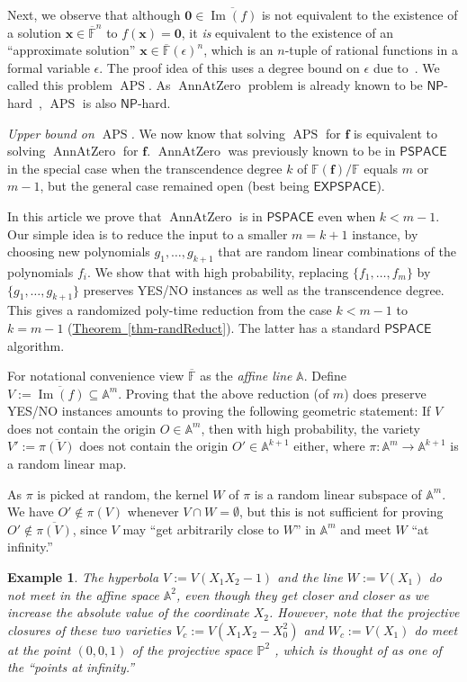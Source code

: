 \documentclass[11pt]{article}
\numberwithin{equation}{section}
\theoremstyle{definition}
\theoremstyle{plain}
\newcommand{\cclass}[1]{\textsf{#1}}
\newcommand{\expref}[2]{\hyperref[#2]{#1~\ref{#2}}}
\newtheorem{exmp}{Example}
\newcommand{\F}{\mathbb{F}}
\newcommand{\aff}{\mathbb{A}}
\newcommand{\proj}{\mathbb{P}}
\DeclareMathOperator{\im}{\mathrm{Im}}
\newcommand{\ol}[1]{\overline{#1}}
\newcommand{\NP}{\cclass{NP}\xspace}  %
\newcommand{\PSPACE}{\cclass{PSPACE}\xspace}  %
\newcommand{\EXPSPACE}{\cclass{EXPSPACE}\xspace} %
\DeclareMathOperator{\APS}{\mathrm{APS}\xspace} %
\DeclareMathOperator{\AnnAtZero}{\mathrm{AnnAtZero}\xspace} %
\begin{document}
Next, we observe that although $\mathbf{0}\in \overline{\im(f)}$ is not equivalent to the existence of a solution $\mathbf x\in \ol{\F}^n$ to $f(\mathbf x)= \mathbf 0$, it \emph{is} equivalent to the existence of an  ``approximate solution'' $\mathbf x\in \ol{\F}(\epsilon)^n$, which is an $n$-tuple of rational functions in a formal variable $\epsilon$. The proof idea of this uses a degree bound on $\epsilon$ due to~\cite{LL89}. We called this problem $\APS$. As $\AnnAtZero$ problem is already known to be $\NP$-hard~\cite{Kay09}, $\APS$ is also $\NP$-hard. 

%
\emph{Upper bound on $\APS$.}   %
We now know 
%
that solving %
 $\APS$ for $\mathbf f$ is equivalent to solving $\AnnAtZero$ for $\mathbf f$. $\AnnAtZero$ was previously known to be in $\PSPACE$ in the special case when the transcendence degree $k$ of $\F(\mathbf f)/\F$ equals $m$ or $m-1$, but the general case remained open (best being
%
$\EXPSPACE$).   %

In this
%
article  %
we prove that $\AnnAtZero$ is in $\PSPACE$ even when $k<m-1$. Our simple idea is to reduce the input to a smaller $m=k+1$ instance, by choosing new polynomials $g_1,\dots,g_{k+1}$ that are random linear combinations of 
%
the polynomials $f_i$. %
We show that with high probability, replacing $\{f_1,\dots,f_m\}$ by $\{g_1,\dots,g_{k+1}\}$ preserves YES/NO instances as well as the transcendence degree. This gives a randomized poly-time reduction from the case $k<m-1$ to $k=m-1$ (\expref{Theorem}{thm-randReduct}). The latter has a standard $\PSPACE$ algorithm.

For notational convenience view $\ol{\F}$ as the \emph{affine line} $\aff$.
Define $V:=\overline{\im(f)}\subseteq \aff^m$. Proving that the above reduction (of $m$) does preserve YES/NO instances amounts to proving the following geometric statement: If $V$ does not contain the origin $O\in\aff^m$, then with high probability, the variety $V':=\overline{\pi(V)}$ does not contain the origin $O'\in\aff^{k+1}$ either, where $\pi:\aff^m\to \aff^{k+1}$ is a random linear map. 

As $\pi$ is picked at random, the kernel $W$ of $\pi$ is a random linear subspace of $\aff^m$.
We have $O'\not\in \pi(V)$ whenever $V\cap  W=\emptyset$, but this is not sufficient for proving $O'\not\in \overline{\pi(V)}$, since $V$ may ``get arbitrarily close to $W$'' in $\aff^m$ and meet $W$ ``at infinity.'' 

\begin{exmp}
The hyperbola $V:=V(X_1 X_2-1)$ and the line $W:=V(X_1)$ do not meet in the affine space $\aff^2$, even though they get closer and closer as we increase the absolute value of the coordinate $X_2$.
However, note that the  projective closures of these two varieties $V_c:=V(X_1X_2-X_0^2)$ and $W_c:=V(X_1)$ do meet at the point $(0,0,1)$ of  the projective space $\proj^2$ , which is thought of as one of the ``points at infinity.'' %
\end{exmp}
\end{document}
